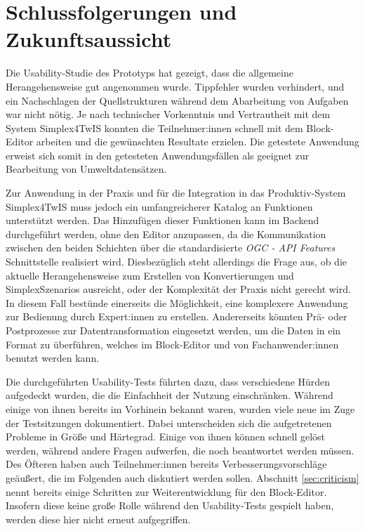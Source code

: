 \newcommand{\qref}[2]{(Vgl. \hyperref[#2]{\ref*{sec:qualitative}, \textbf{#1}})}
\section{Schlussfolgerungen und Zukunftsaussicht}

Die Usability-Studie des Prototyps hat gezeigt, dass die allgemeine Herangehensweise gut angenommen wurde. Tippfehler wurden verhindert, und ein Nachschlagen der Quellstrukturen während dem Abarbeitung von Aufgaben war nicht nötig. Je nach technischer Vorkenntnis und Vertrautheit mit dem System Simplex4TwIS konnten die Teilnehmer:innen schnell mit dem Block-Editor arbeiten und die gewünschten Resultate erzielen. Die getestete Anwendung erweist sich somit in den getesteten Anwendungsfällen als geeignet zur Bearbeitung von Umweltdatensätzen.

Zur Anwendung in der Praxis und für die Integration in das Produktiv-System Simplex4TwIS muss jedoch ein umfangreicherer Katalog an Funktionen unterstützt werden. Das Hinzufügen dieser Funktionen kann im Backend durchgeführt werden, ohne den Editor anzupassen, da die Kommunikation zwischen den beiden Schichten über die standardisierte \textit{OGC - API Features} Schnittstelle realisiert wird. Diesbezüglich steht allerdings die Frage aus, ob die aktuelle Herangehensweise zum Erstellen von Konvertierungen und SimplexSzenarios ausreicht, oder der Komplexität der Praxis nicht gerecht wird. In diesem Fall bestünde einerseits die Möglichkeit, eine komplexere Anwendung zur Bedienung durch Expert:innen zu erstellen. Andererseits könnten Prä- oder Postprozesse zur Datentransformation eingesetzt werden, um die Daten in ein Format zu überführen, welches im Block-Editor und von Fachanwender:innen benutzt werden kann.

Die durchgeführten Usability-Tests führten dazu, dass verschiedene Hürden aufgedeckt wurden, die die Einfachheit der Nutzung einschränken. Während einige von ihnen bereits im Vorhinein bekannt waren, wurden viele neue im Zuge der Testsitzungen dokumentiert. Dabei unterscheiden sich die aufgetretenen Probleme in Größe und Härtegrad. Einige von ihnen können schnell gelöst werden, während andere Fragen aufwerfen, die noch beantwortet werden müssen. Des Öfteren haben auch Teilnehmer:innen bereits Verbesserungsvorschläge geäußert, die im Folgenden auch diskutiert werden sollen. Abschnitt \ref{sec:criticism} nennt bereits einige Schritten zur Weiterentwicklung für den Block-Editor. Insofern diese keine große Rolle während den Usability-Tests gespielt haben, werden diese hier nicht erneut aufgegriffen.

